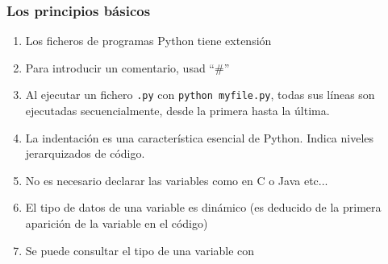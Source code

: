 \documentclass[handout,9pt]{beamer}
\newcommand{\inlinecode}[1]{{\tt \textcolor{mycodecolor}{#1}}}
\begin{document}
\begin{frame}
  \frametitle{Los principios básicos}
  \begin{enumerate}
  \item Los ficheros de programas Python tiene extensión 
  \item Para introducir un comentario, usad  ``\#''
  \item Al ejecutar un fichero \inlinecode{.py} con
    \inlinecode{python myfile.py}, todas sus líneas son ejecutadas secuencialmente, desde la primera hasta la última.
  \item La indentación es una característica esencial de Python. Indica niveles jerarquizados de código.
  \item No es necesario declarar las variables como en C o Java etc...
  \item El tipo de datos de una variable es dinámico (es deducido de la primera aparición de la variable en el código)
  \item Se puede consultar el tipo de una variable  con  
  \end{enumerate}
\end{frame}
\end{document}
